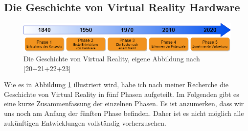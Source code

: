 \subsection{Die Geschichte von Virtual Reality Hardware}\label{sec:VRGeschichte}
\begin{figure}[h]
	\centering
	\includegraphics[width=1\linewidth]{Bilder/A12_GeschichteVR}
	\caption{Die Geschichte von Virtual Reality, eigene Abbildung nach [20+21+22+23]}
	\label{fig:GeschichteVR}
\end{figure}
\noindent Wie es in Abbildung \ref{fig:GeschichteVR} illustriert wird, habe ich nach meiner Recherche die Geschichte von Virtual Reality in fünf Phasen aufgeteilt. Im Folgenden gibt es eine kurze Zusammenfassung der einzelnen Phasen. Es ist anzumerken, dass wir uns noch am Anfang der fünften Phase befinden. Daher ist es nicht möglich alle zukünftigen Entwicklungen vollständig vorherzusehen.

